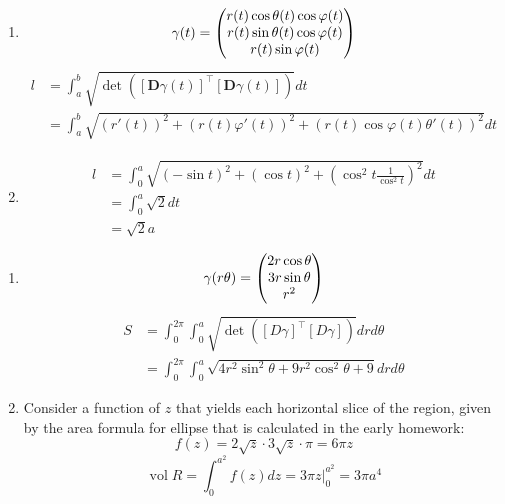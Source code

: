 \documentclass{homework}
\DeclareMathOperator{\vol}{vol}
\begin{document}
\begin{problem}{2}
\begin{enumerate}
\item
$$\gamma(t)=\begin{pmatrix}
r(t)\cos\theta(t)\cos\varphi(t)\\
r(t)\sin\theta(t)\cos\varphi(t)\\
r(t)\sin\varphi(t)\end{pmatrix}$$
\begin{align*}
l  &=
\int_a^b \sqrt{\det([\mathbf{D}\gamma(t)]^{\top}[\mathbf{D}\gamma(t)])}dt
\\ &=
\int_a^b \sqrt{(r'(t))^2+(r(t)\varphi'(t))^2+(r(t)\cos\varphi(t)\theta'(t))^2}dt
\end{align*}

\item
\begin{align*}
l  &=
\int_0^a \sqrt{(-\sin{t})^2+(\cos{t})^2+(\cos^2t\frac{1}{\cos^2t})^2}dt
\\ &= \int_0^a \sqrt{2} dt
\\ &= \sqrt{2}a
\end{align*}
\end{enumerate}
\end{problem}

\begin{problem}{3}
\begin{enumerate}
\item
$$\gamma(r\\\theta)=\begin{pmatrix}2r\cos\theta\\3r\sin\theta\\r^2\end{pmatrix}$$
\begin{align*}
S  &=
\int_0^{2\pi}\int_0^a \sqrt{\det([D\gamma]^{\top}[D\gamma])}drd\theta
\\ &=
\int_0^{2\pi}\int_0^a \sqrt{4r^2\sin^2\theta+9r^2\cos^2\theta+9}drd\theta
\end{align*}

\item
Consider a function of $z$ that yields each horizontal slice of the region,
given by the area formula for ellipse that is calculated in the early homework:
$$f(z) = 2\sqrt{z}\cdot3\sqrt{z}\cdot\pi=6\pi z$$
$$\vol{R}=\int_0^{a^2}f(z)dz=3\pi z|_0^{a^2}=3\pi a^4$$
\end{enumerate}
\end{problem}
\end{document}

